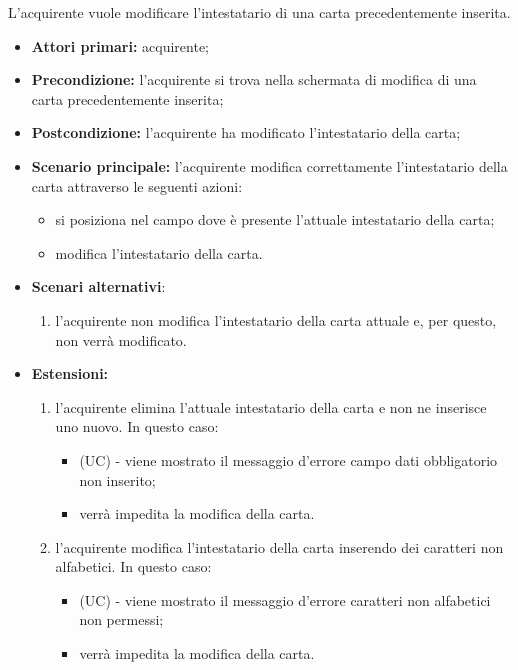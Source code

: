 L'acquirente vuole modificare l'intestatario di una carta precedentemente inserita.
\begin{itemize}
    \item \textbf{Attori primari:} acquirente;
    \item \textbf{Precondizione:} l'acquirente si trova nella schermata di modifica di una carta precedentemente inserita;
    \item \textbf{Postcondizione:} l'acquirente ha modificato l'intestatario della carta;
    \item \textbf{Scenario principale:} l'acquirente modifica correttamente l'intestatario della carta attraverso le seguenti azioni:
    \begin{itemize}
        \item si posiziona nel campo dove è presente l'attuale intestatario della carta;
        \item modifica l'intestatario della carta.
    \end{itemize}
    \item \textbf{Scenari alternativi}:
    \begin{enumerate}[label=\lett]
        \item l'acquirente non modifica l'intestatario della carta attuale e, per questo, non verrà modificato.
    \end{enumerate}
    \item \textbf{Estensioni:}
    \begin{enumerate}[label=\lett]
        \item l'acquirente elimina l'attuale intestatario della carta e non ne inserisce uno nuovo. In questo caso:
        \begin{itemize}
            \item (UC) - viene mostrato il messaggio d'errore campo dati obbligatorio non inserito;
            \item verrà impedita la modifica della carta.
        \end{itemize}
        \item l'acquirente modifica l'intestatario della carta inserendo dei caratteri non alfabetici. In questo caso:
        \begin{itemize}
            \item (UC) - viene mostrato il messaggio d'errore caratteri non alfabetici non permessi;
            \item verrà impedita la modifica della carta.
        \end{itemize}
    \end{enumerate}
\end{itemize}

